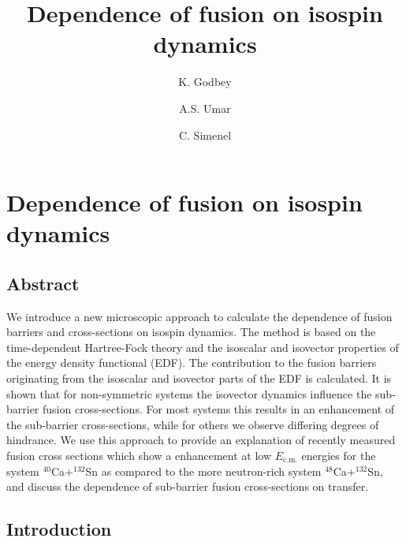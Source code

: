 
\chapter{Dependence of fusion on isospin dynamics}\label{chapters:chapter_2}
\vspace{-7mm}

\title{Dependence of fusion on isospin dynamics}

\author[1]{K. Godbey}
\author[1]{A.S. Umar}
\author[2]{C. Simenel}



\section*{Abstract}
	We introduce a new microscopic approach to calculate the dependence of fusion barriers and cross-sections on
	isospin dynamics. The method is based on the time-dependent Hartree-Fock theory and
	the isoscalar and isovector properties of the energy density functional (EDF). The contribution to
	the fusion barriers originating from the isoscalar and isovector parts of the EDF is calculated.
	It is shown that for non-symmetric systems the isovector dynamics influence the sub-barrier fusion
	cross-sections. For most systems this results in an enhancement of the sub-barrier cross-sections,
	while for others we observe differing degrees of hindrance.
	We use this approach to provide an explanation of recently measured fusion cross sections which show a  enhancement at low $E_\mathrm{c.m.}$ energies
	for the system $^{40}$Ca+$^{132}$Sn as compared to the more neutron-rich system
	$^{48}$Ca+$^{132}$Sn, and discuss the dependence of sub-barrier fusion cross-sections on transfer.
	
\section{Introduction}

